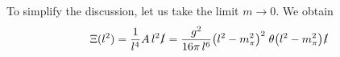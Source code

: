 \documentclass[preprintnumbers,floatfix,nofootinbib]{revtex4}
\begin{document}
To simplify the discussion, let us take the limit $m \to 0$. We obtain
\begin{equation}
\begin{split} 
\Xi (l^2) =
\frac{1}{l^4}
 A\, l^2  \slashed{l} 
= \frac{g^2}{16 \pi\, l^6} \bigl(l^2-m_{\pi}^2\bigr)^2 
\;\theta\bigl(l^2 - m_{\pi}^2\bigr)
 \slashed{l} 
\end{split} 
\end{equation} 




\end{document}
